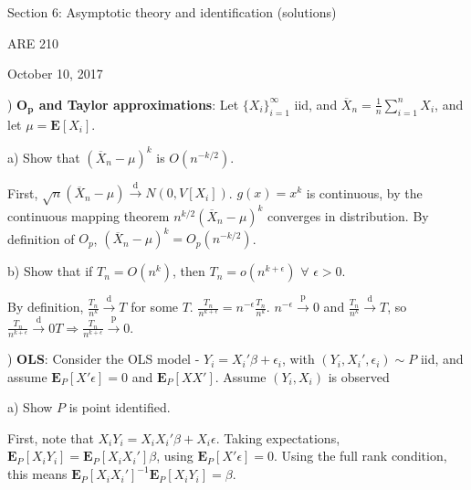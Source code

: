 \documentclass[12pt,english]{article}
\begin{document}
\begin{center}
{\Large{}Section 6: Asymptotic theory and identification (solutions)}
\par\end{center}{\Large \par}

\begin{center}
ARE 210
\par\end{center}

\begin{center}
October 10, 2017
\par\end{center}

) \textbf{$\mathbf{O_{p}}$ and Taylor approximations}: Let $\{ X_{i} \}_{i=1}^{\infty}$ iid, and $\overline{X}_{n} = \frac{1}{n} \sum_{i=1}^{n} X_{i}$, and let $\mu = \mathbf{E}[X_{i}]$.

a) Show that $ ( \overline{X}_{n} - \mu )^{k}$ is $O\left(n^{-k/2}\right)$.
\vspace{1em}

First, $\sqrt{n} (\overline{X}_{n} - \mu) \overset{\text{d}}{\to} N(0, V[X_{i}])$. $g(x) = x^{k}$ is continuous, by the continuous mapping theorem $n^{k/2} (\overline{X}_{n} - \mu)^{k}$ converges in distribution. By definition of $O_{p}$, $(\overline{X}_{n} - \mu)^{k} = O_{p}(n^{-k/2})$.

\vspace{1em}
b) Show that if $T_{n} = O(n^{k})$, then $T_{n} = o(n^{k + \epsilon})$ $\forall$ $\epsilon > 0$.
\vspace{1em}

By definition, $\frac{T_{n}}{n^{k}} \overset{\text{d}}{\to} T$ for some $T$. $\frac{T_{n}}{n^{k + \epsilon}} = n^{-\epsilon} \frac{T_{n}}{n^{k}}$. $n^{-\epsilon} \overset{\text{p}}{\to} 0$ and $\frac{T_{n}}{n^{k}} \overset{\text{d}}{\to} T$, so $\frac{T_{n}}{n^{k + \epsilon}} \overset{\text{d}}{\to} 0T \Rightarrow \frac{T_{n}}{n^{k + \epsilon}} \overset{\text{p}}{\to} 0$.

\vspace{1em}
) \textbf{OLS}: Consider the OLS model - $Y_{i} = X_{i}'\beta + \epsilon_{i}$, with $(Y_{i}, X_{i}', \epsilon_{i}) \sim P$ iid, and assume $\mathbf{E}_{P}[X'\epsilon] = 0$ and $\mathbf{E}_{P}[XX']$. Assume $(Y_{i}, X_{i})$ is observed

a) Show $P$ is point identified.
\vspace{1em}

First, note that $X_{i} Y_{i} = X_{i} X_{i}' \beta + X_{i} \epsilon$. Taking expectations, $\mathbf{E}_{P}[X_{i} Y_{i}] = \mathbf{E}_{P}[X_{i} X_{i}'] \beta$, using $\mathbf{E}_{P}[X'\epsilon] = 0$. Using the full rank condition, this means $\mathbf{E}_{P}[X_{i} X_{i}']^{-1} \mathbf{E}_{P}[X_{i} Y_{i}] = \beta$.
\end{document}
